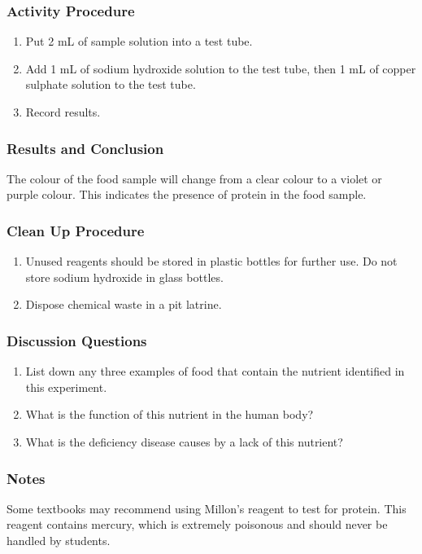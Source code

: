 \subsubsection*{Activity Procedure}
\begin{enumerate}
\item{Put 2 mL of sample solution into a test tube.}
\item{Add 1 mL of sodium hydroxide solution to the test tube, then 1 mL of copper sulphate solution to the test tube.}
\item{Record results.}
\end{enumerate}

\subsubsection*{Results and Conclusion}
The colour of the food sample will change from a clear colour to a violet or purple colour. This indicates the presence of protein in the food sample.

\subsubsection*{Clean Up Procedure}
\begin{enumerate}
\item{Unused reagents should be stored in plastic bottles for further use. Do not store sodium hydroxide in glass bottles.}
\item{Dispose chemical waste in a pit latrine.}
\end{enumerate}

\subsubsection*{Discussion Questions}
\begin{enumerate}
\item{List down any three examples of food that contain the nutrient identified in this experiment.}
\item{What is the function of this nutrient in the human body?}
\item{What is the deficiency disease causes by a lack of this nutrient?}
\end{enumerate}

\subsubsection*{Notes}
Some textbooks may recommend using Millon's reagent to test for protein. This reagent contains mercury, which is extremely poisonous and should never be handled by students.

